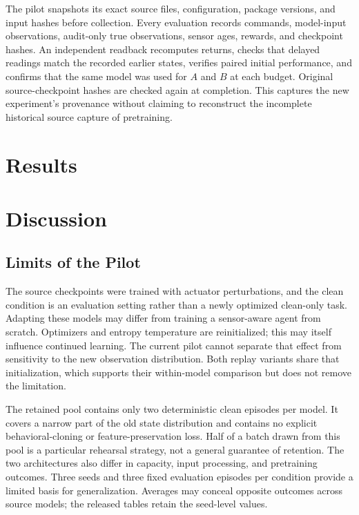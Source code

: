\documentclass[runningheads]{llncs}
\begin{document}
The pilot snapshots its exact source files, configuration, package versions, and input hashes before collection. Every evaluation records commands, model-input observations, audit-only true observations, sensor ages, rewards, and checkpoint hashes. An independent readback recomputes returns, checks that delayed readings match the recorded earlier states, verifies paired initial performance, and confirms that the same model was used for $A$ and $B$ at each budget. Original source-checkpoint hashes are checked again at completion. This captures the new experiment's provenance without claiming to reconstruct the incomplete historical source capture of pretraining.

\section{Results}


\FloatBarrier
\section{Discussion}


\subsection{Limits of the Pilot}
The source checkpoints were trained with actuator perturbations, and the clean condition is an evaluation setting rather than a newly optimized clean-only task. Adapting these models may differ from training a sensor-aware agent from scratch. Optimizers and entropy temperature are reinitialized; this may itself influence continued learning. The current pilot cannot separate that effect from sensitivity to the new observation distribution. Both replay variants share that initialization, which supports their within-model comparison but does not remove the limitation.

The retained pool contains only two deterministic clean episodes per model. It covers a narrow part of the old state distribution and contains no explicit behavioral-cloning or feature-preservation loss. Half of a batch drawn from this pool is a particular rehearsal strategy, not a general guarantee of retention. The two architectures also differ in capacity, input processing, and pretraining outcomes. Three seeds and three fixed evaluation episodes per condition provide a limited basis for generalization. Averages may conceal opposite outcomes across source models; the released tables retain the seed-level values.
\end{document}
